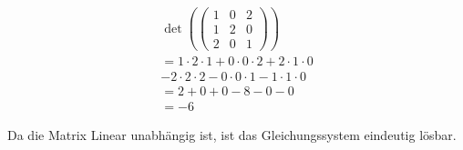 \begin{align*}
    \det \left(\begin{pmatrix}
                   1 & 0 & 2 \\
                   1 & 2 & 0 \\
                   2 & 0 & 1
               \end{pmatrix}\right)                             \\
    = 1 \cdot 2 \cdot 1 + 0 \cdot 0 \cdot 2 + 2 \cdot 1 \cdot 0 \\
    - 2 \cdot 2 \cdot 2 - 0 \cdot 0 \cdot 1 - 1 \cdot 1 \cdot 0 \\
    = 2 + 0 + 0 - 8 - 0 - 0                                     \\
    = -6
\end{align*}

Da die Matrix Linear unabhängig ist, ist das Gleichungssystem eindeutig lösbar.
